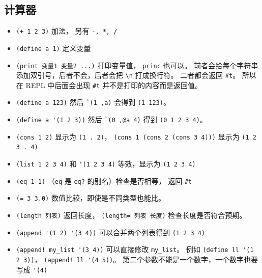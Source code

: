 \subsection{计算器}
\begin{itemize}
\item \verb`(+ 1 2 3)` 加法， 另有 \verb`-, *, /`
\item \verb`(define a 1)` 定义变量
\item \verb`(print 变量1 变量2 ...)` 打印变量值， \verb`princ` 也可以。 前者会给每个字符串添加双引号，后者不会，后者会把 \verb`\n` 打成换行符。 二者都会返回 \verb`#t`。 所以在 REPL 中后面会出现 \verb`#t` 并不是打印的内容而是返回值。
\item \verb`(define a 123)` 然后 \verb|`(1 ,a)| 会得到 \verb`(1 123)`。
\item \verb`(define a '(1 2 3))` 然后 \verb|`(0 ,@a 4)| 得到 \verb`(0 1 2 3 4)`。
\item \verb`(cons 1 2)` 显示为 \verb`(1 . 2)`， \verb`(cons 1 (cons 2 (cons 3 4)))` 显示为 \verb`(1 2 3 . 4)`
\item \verb`(list 1 2 3 4)` 和 \verb`'(1 2 3 4)` 等效，显示为 \verb`(1 2 3 4)`
\item \verb`(eq 1 1)` （\verb`eq` 是 \verb`eq?` 的别名）检查是否相等， 返回 \verb`#t`
\item \verb`(= 3 3.0)` 数值比较，即使是不同类型也能比。
\item \verb`(length 列表)` 返回长度， \verb`(length= 列表 长度)` 检查长度是否符合预期。
\item \verb`(append '(1 2) '(3 4))` 可以合并两个列表得到 \verb`(1 2 3 4)`
\item \verb`(append! my_list '(3 4))` 可以直接修改 \verb`my_list`。 例如 \verb`(define ll '(1 2 3))`， \verb`(append! ll '(4 5))`。 第二个参数不能是一个数字，一个数字也要写成 \verb`'(4)`
\end{itemize}

